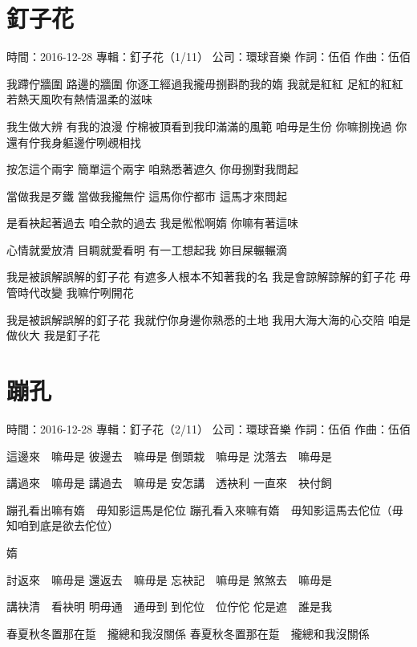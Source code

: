 \documentclass[UTF8,a4paper,oneside,twocolumn,12pt]{ctexbook}
\newcommand{\infopair}[2]{\textbullet #1：#2}
\newcommand{\zc}[1][伍佰]{\infopair{作詞}{#1}}
\newcommand{\zq}[1][伍佰]{\infopair{作曲}{#1}}
\newcommand{\zj}[1]{\infopair{專輯}{#1}}
\newcommand{\sj}[1]{\infopair{時間}{#1}}
\newcommand{\gs}[1]{\infopair{公司}{#1}}
\newenvironment{info}{\begin{flushleft}\kaishu
	}
	{\end{flushleft}\normalsize\yahei\par}
\newenvironment{lyric}{
	}
{}
\begin{document}
\section{釘子花}
\begin{info}
	\sj{2016-12-28}
	\zj{釘子花（1/11）}
	\gs{環球音樂}
	\zc
	\zq
\end{info}
\begin{lyric}
	我蹛佇牆圍 路邊的牆圍
	你逐工經過我攏毋捌斟酌我的媠
	我就是紅紅 足紅的紅紅
	若熱天風吹有熱情溫柔的滋味

	我生做大辨 有我的浪漫
	佇棉被頂看到我印滿滿的風範
	咱毋是生份 你嘛捌挽過
	你還有佇我身軀邊佇咧覕相找

	按怎這个兩字 簡單這个兩字
	咱熟悉著遮久 你毋捌對我問起

	當做我是歹鐵 當做我攏無佇
	這馬你佇都市 這馬才來問起

	是看袂起著過去 咱仝款的過去
	我是倯倯啊媠 你嘛有著這味

	心情就愛放清 目睭就愛看明
	有一工想起我 妳目屎輾輾滴

	我是被誤解誤解的釘子花
	有遮多人根本不知著我的名
	我是會諒解諒解的釘子花
	毋管時代改變 我嘛佇咧開花

	我是被誤解誤解的釘子花
	我就佇你身邊你熟悉的土地
	我用大海大海的心交陪
	咱是做伙大 我是釘子花
\end{lyric}

\section{蹦孔}
\begin{info}
	\sj{2016-12-28}
	\zj{釘子花（2/11）}
	\gs{環球音樂}
	\zc
	\zq
\end{info}
\begin{lyric}
	這邊來　嘛毋是
	彼邊去　嘛毋是
	倒頭栽　嘛毋是
	沈落去　嘛毋是

	講過來　嘛毋是
	講過去　嘛毋是
	安怎講　透袂利
	一直來　袂付飼

	蹦孔看出嘛有媠　毋知影這馬是佗位
	蹦孔看入來嘛有媠　毋知影這馬去佗位（毋知咱到底是欲去佗位）

	媠

	討返來　嘛毋是
	還返去　嘛毋是
	忘袂記　嘛毋是
	煞煞去　嘛毋是

	講袂清　看袂明
	明毋通　通毋到
	到佗位　位佇佗
	佗是遮　誰是我

	春夏秋冬置那在踅　攏總和我沒關係
	春夏秋冬置那在踅　攏總和我沒關係
\end{lyric}
\end{document}

